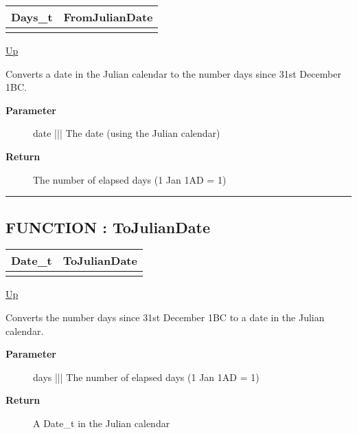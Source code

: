 {\renewcommand{\arraystretch}{1.5}
\begin{tabularx}{\textwidth}{|>{\raggedright\arraybackslash}l|X|}
\hline
\hspace{0pt}Days\_t & FromJulianDate \\
\hline
\multicolumn{2}{|>{\raggedright\arraybackslash}X|}{\hspace{0pt}(Date\_t date)} \\
\hline
\end{tabularx}
}

\hyperlink{ecldoc:Date}{Up}

\par
Converts a date in the Julian calendar to the number days since 31st December 1BC.

\par
\begin{description}
\item [\textbf{Parameter}] date ||| The date (using the Julian calendar)
\item [\textbf{Return}] The number of elapsed days (1 Jan 1AD = 1)
\end{description}

\rule{\textwidth}{0.4pt}
\subsection*{FUNCTION : ToJulianDate}
\hypertarget{ecldoc:date.tojuliandate}{}

{\renewcommand{\arraystretch}{1.5}
\begin{tabularx}{\textwidth}{|>{\raggedright\arraybackslash}l|X|}
\hline
\hspace{0pt}Date\_t & ToJulianDate \\
\hline
\multicolumn{2}{|>{\raggedright\arraybackslash}X|}{\hspace{0pt}(Days\_t days)} \\
\hline
\end{tabularx}
}

\hyperlink{ecldoc:Date}{Up}

\par
Converts the number days since 31st December 1BC to a date in the Julian calendar.

\par
\begin{description}
\item [\textbf{Parameter}] days ||| The number of elapsed days (1 Jan 1AD = 1)
\item [\textbf{Return}] A Date\_t in the Julian calendar
\end{description}

